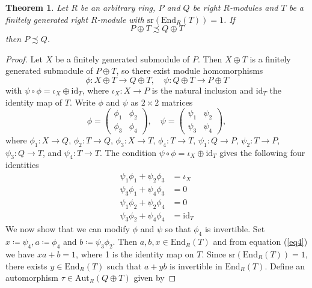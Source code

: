 \documentclass[11pt]{amsart}
\numberwithin{equation}{section}
\newtheorem{thm}[thmCt]{Theorem}
\theoremstyle{definition}
\theoremstyle{plain}
\theoremstyle{definition}
\begin{document}
\begin{thm} \label{cancelacio fg}
Let $R$ be an arbitrary ring, $P$ and $Q$ be right $R$-modules and $T$ be a finitely generated right $R$-module with $\mathrm{sr}(\mathrm{End}_R(T)) = 1$. If 
\begin{equation*}
    P \oplus T \precsim Q \oplus T
\end{equation*}
then $P \precsim Q$. 
\end{thm}

\begin{proof}
Let $X$ be a finitely generated submodule of $P$. Then $X \oplus T$ is a finitely generated submodule of $P \oplus T$, so there exist module homomorphisms 
\begin{equation*}
    \phi \colon X \oplus T \rightarrow Q \oplus T, \quad \psi \colon Q \oplus T \rightarrow P \oplus T
\end{equation*}
with $\psi \circ \phi = \iota_{X} \oplus \mathrm{id}_{T}$, where $\iota_X \colon X \rightarrow P$ is the natural inclusion and $\mathrm{id}_T$ the identity map of $T$. Write $\phi$ and $\psi$ as $2 \times 2$ matrices 
\begin{equation*}
    \phi = \begin{pmatrix}
        \phi_1 & \phi_2 \\
        \phi_3 & \phi_4 
    \end{pmatrix}, \quad \psi = \begin{pmatrix}
        \psi_1 & \psi_2 \\
        \psi_3 & \psi_4 
    \end{pmatrix},
\end{equation*}
where $\phi_1\colon X \rightarrow Q$, $\phi_2\colon T \rightarrow Q$, $\phi_3\colon X \rightarrow T$, $\phi_4\colon T \rightarrow T$, $\psi_1\colon Q \rightarrow P$, $\psi_2\colon T \rightarrow P$, $\psi_3\colon Q \rightarrow T$, and $\psi_4\colon T \rightarrow T$. The condition $\psi \circ \phi = \iota_{X} \oplus \mathrm{id}_{T}$ gives
the following four identities
\begin{align} \label{eq1}
    \psi_1\phi_1 + \psi_2\phi_3 & = \iota_{X} \\
    \psi_3\phi_1 + \psi_4\phi_3 & = 0 \\ \label{eq3}
    \psi_1\phi_2 + \psi_2\phi_4 & = 0 \\ \label{eq4}
    \psi_3\phi_2 + \psi_4\phi_4 & = \mathrm{id}_{T} 
\end{align}
We now show that we can modify $\phi$ and $\psi$ so that $\phi_4$ is invertible. Set $x \coloneqq \psi_4, a \coloneqq \phi_4$ and $b \coloneqq \psi_3\phi_2$. Then $a, b, x \in \mathrm{End}_R(T)$ and from equation (\ref{eq4}) we have $xa + b = 1$, where 1 is the identity map on $T$. Since $\mathrm{sr}(\mathrm{End}_R(T)) = 1$, there exists $y \in \mathrm{End}_R(T)$ such that $a + yb$ is invertible in $\mathrm{End}_R(T)$. Define an automorphism $\tau \in \mathrm{Aut}_R(Q \oplus T)$ given by 

\end{proof}
\end{document}
